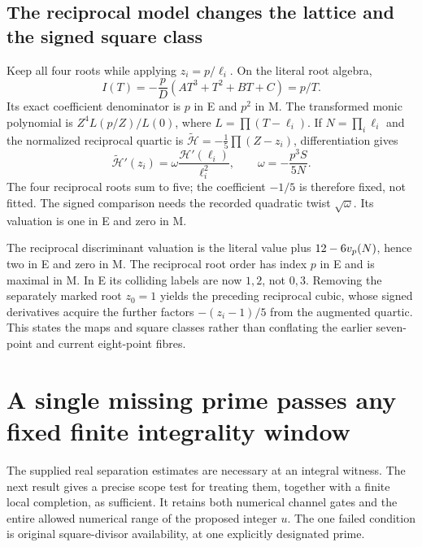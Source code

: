 \subsection{The reciprocal model changes the lattice and the signed square class}
\label{sec:reciprocal}
Keep all four roots while applying $z_i=p/\ell_i$. On the literal root algebra,
\[
 \boxed{I(T)=-\frac pD(AT^3+T^2+BT+C)=p/T.}              \tag{IC30}
\]
Its exact coefficient denominator is $p$ in E and $p^2$ in M. The transformed
monic polynomial is $Z^4L(p/Z)/L(0)$, where $L=\prod(T-\ell_i)$.
If $N=\prod_i\ell_i$ and the normalized reciprocal quartic is
$\widetilde{\mathcal H}=-\frac15\prod(Z-z_i)$, differentiation gives
\[
 \boxed{\widetilde{\mathcal H}'(z_i)=
 \omega\frac{\mathcal H'(\ell_i)}{\ell_i^2},\qquad
 \omega=-\frac{p^3S}{5N}.}                              \tag{IC31}
\]
The four reciprocal roots sum to five; the coefficient $-1/5$ is therefore
fixed, not fitted. The signed comparison needs the recorded quadratic twist
$\sqrt\omega$. Its valuation is one in E and zero in M.

The reciprocal discriminant valuation is the literal value plus
$12-6v_p(N)$, hence two in E and zero in M. The reciprocal root order has
index $p$ in E and is maximal in M. In E its colliding labels are now $1,2$,
not $0,3$. Removing the separately marked root $z_0=1$ yields the preceding
reciprocal cubic, whose signed derivatives acquire the further factors
$-(z_i-1)/5$ from the augmented quartic. This states the maps and square classes
rather than conflating the earlier seven-point and current eight-point fibres.

\section{A single missing prime passes any fixed finite integrality window}
The supplied real separation estimates \cite[\S1.2, equations (2)--(4)]{Input}
are necessary at an integral witness. The next result gives a precise scope
test for treating them, together with a finite local completion, as sufficient.
It retains both numerical channel gates and the entire allowed numerical range
of the proposed integer $u$. The one failed condition is original square-divisor
availability, at one explicitly designated prime.

